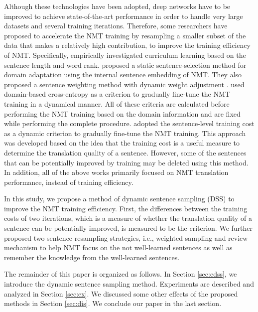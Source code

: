 \documentclass[11pt,a4paper]{article}
\begin{document}
Although these technologies have been adopted, deep networks have to be improved to achieve state-of-the-art performance in order to handle very large datasets and several training iterations. Therefore, some researchers have proposed to accelerate the NMT training by resampling a smaller subset of the data that makes a relatively high contribution, to improve the training efficiency of NMT. Specifically,  \citet{DBLP:journals/corr/KocmiB17aa} empirically investigated curriculum learning based on the sentence length and word rank. \citet{wang-EtAl:2017:Short3} proposed a static sentence-selection method for domain adaptation using the internal sentence embedding of NMT. They also proposed a sentence weighting method with dynamic weight adjustment \cite{wang-EtAl:2017:EMNLP20174}. \citet{vanderwees-bisazza-monz:2017:EMNLP2017} used domain-based cross-entropy as a criterion to  gradually fine-tune the NMT training in a dynamical manner. All of these criteria \citep{wang-EtAl:2017:Short3,wang-EtAl:2017:EMNLP20174,vanderwees-bisazza-monz:2017:EMNLP2017} are calculated before performing the NMT training based on the domain information and are fixed while performing the complete procedure. \citet{zhang-EtAl:2017:I17-2} adopted the sentence-level training cost as a dynamic criterion to gradually fine-tune the NMT training. This approach was developed based on the idea that the training cost is a useful measure to determine the translation quality of a sentence.  However, some of the sentences that can be potentially improved by training may be deleted using this method. In addition, all of the above works primarily focused on NMT translation performance, instead of training efficiency.


In this study, we propose a method of dynamic sentence sampling (DSS) to improve the NMT training efficiency. First, the differences between the training costs of two iterations, which is a measure of  whether the translation quality of a sentence can be potentially improved, is measured to be the criterion.  We further proposed two sentence resampling strategies, i.e.,  weighted sampling and  review mechanism to help NMT focus on the not well-learned sentences as well as remember the knowledge from the well-learned sentences.

The remainder of this paper is organized as follows. In Section \ref{sec:edss}, we introduce the dynamic sentence sampling method.  Experiments are described and analyzed in Section \ref{sec:ex}. We discussed some other effects of the proposed methods in Section \ref{sec:dis}. We conclude our paper in the last section.
\end{document}
